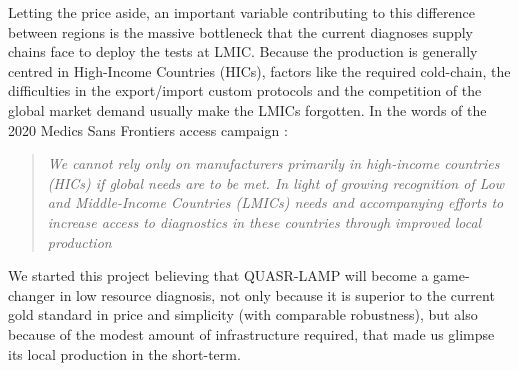 Letting the price aside, an important variable contributing to this difference between regions is the massive bottleneck that the current diagnoses supply chains face to deploy the tests at LMIC. Because the production is generally centred in High-Income Countries (HICs), factors like the required cold-chain, the difficulties in the export/import custom protocols and the competition of the global market demand usually make the LMICs forgotten. In the words of the 2020 Medics Sans Frontiers access campaign \cite{medecins_sans_frontieres_local_2021}:
\\
\begin{quote}
\emph{We cannot rely only on manufacturers primarily in high-income countries (HICs) if global needs are to be met. In light of growing recognition of Low and Middle-Income Countries (LMICs) needs and accompanying efforts to increase access to diagnostics in these countries through improved local production}
\end{quote}
\vspace{20pt}

We started this project believing that QUASR-LAMP will become a game-changer in low resource diagnosis, not only because it is superior to the current gold standard in price and simplicity (with comparable robustness), but also because of the modest amount of infrastructure required, that made us glimpse its local production in the short-term.


